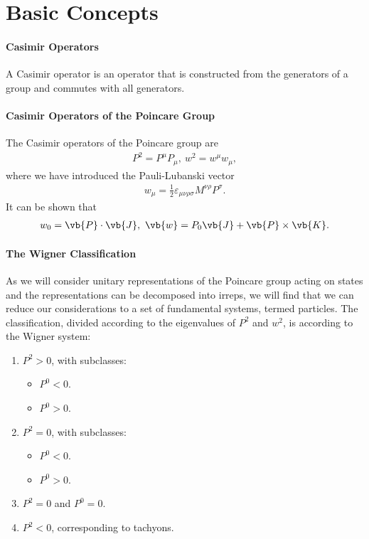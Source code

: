 \section{Basic Concepts}

\paragraph{Casimir Operators}
A Casimir operator is an operator that is constructed from the generators of a group and commutes with all generators.

\paragraph{Casimir Operators of the Poincare Group}
The Casimir operators of the Poincare group are
\begin{align*}
	P^{2} = P^{\mu}P_{\mu},\ w^{2} = w^{\mu}w_{\mu},
\end{align*}
where we have introduced the Pauli-Lubanski vector
\begin{align*}
	w_{\mu} = \frac{1}{2}\varepsilon_{\mu\nu\rho\sigma}M^{\nu\rho}P^{\sigma}. 
\end{align*}
It can be shown that
\begin{align*}
	w_{0} = \vb{P}\cdot\vb{J},\ \vb{w} = P_{0}\vb{J} + \vb{P}\times\vb{K}.
\end{align*}

\paragraph{The Wigner Classification}
As we will consider unitary representations of the Poincare group acting on states and the representations can be decomposed into irreps, we will find that we can reduce our considerations to a set of fundamental systems, termed particles. The classification, divided according to the eigenvalues of $P^{2}$ and $w^{2}$, is according to the Wigner system:
\begin{enumerate}
	\item $P^{2} > 0$, with subclasses:
	\begin{itemize}
		\item $P^{0} < 0$.
		\item $P^{0} > 0$.
	\end{itemize}
	\item $P^{2} = 0$, with subclasses:
	\begin{itemize}
		\item $P^{0} < 0$.
		\item $P^{0} > 0$.
	\end{itemize}
	\item $P^{2} = 0$ and $P^{0} = 0$.
	\item $P^{2} < 0$, corresponding to tachyons.
\end{enumerate}